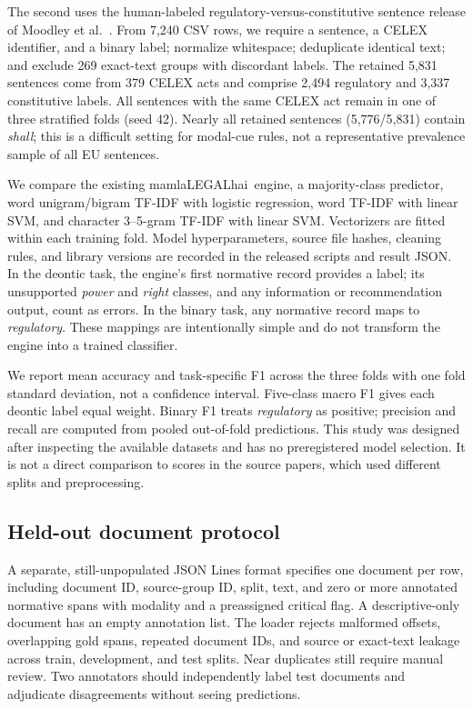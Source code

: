 \documentclass[11pt,a4paper]{article}
\newcommand{\system}{\textsf{mamlaLEGALhai}}
\begin{document}
The second uses the human-labeled regulatory-versus-constitutive sentence release of Moodley et al.\ \cite{moodleydata}. From 7,240 CSV rows, we require a sentence, a CELEX identifier, and a binary label; normalize whitespace; deduplicate identical text; and exclude 269 exact-text groups with discordant labels. The retained 5,831 sentences come from 379 CELEX acts and comprise 2,494 regulatory and 3,337 constitutive labels. All sentences with the same CELEX act remain in one of three stratified folds (seed 42). Nearly all retained sentences (5,776/5,831) contain \emph{shall}; this is a difficult setting for modal-cue rules, not a representative prevalence sample of all EU sentences.

We compare the existing \system\ engine, a majority-class predictor, word unigram/bigram TF-IDF with logistic regression, word TF-IDF with linear SVM, and character 3--5-gram TF-IDF with linear SVM. Vectorizers are fitted within each training fold. Model hyperparameters, source file hashes, cleaning rules, and library versions are recorded in the released scripts and result JSON. In the deontic task, the engine's first normative record provides a label; its unsupported \emph{power} and \emph{right} classes, and any information or recommendation output, count as errors. In the binary task, any normative record maps to \emph{regulatory}. These mappings are intentionally simple and do not transform the engine into a trained classifier.

We report mean accuracy and task-specific F1 across the three folds with one fold standard deviation, not a confidence interval. Five-class macro F1 gives each deontic label equal weight. Binary F1 treats \emph{regulatory} as positive; precision and recall are computed from pooled out-of-fold predictions. This study was designed after inspecting the available datasets and has no preregistered model selection. It is not a direct comparison to scores in the source papers, which used different splits and preprocessing.

\subsection{Held-out document protocol}
A separate, still-unpopulated JSON Lines format specifies one document per row, including document ID, source-group ID, split, text, and zero or more annotated normative spans with modality and a preassigned critical flag. A descriptive-only document has an empty annotation list. The loader rejects malformed offsets, overlapping gold spans, repeated document IDs, and source or exact-text leakage across train, development, and test splits. Near duplicates still require manual review. Two annotators should independently label test documents and adjudicate disagreements without seeing predictions.
\end{document}
